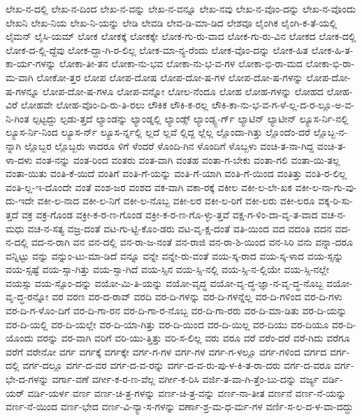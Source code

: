 {ಲೇಖ-ನ-ದಲ್ಲಿ
ಲೇಖ-ನ-ದಿಂದ
ಲೇಖ-ನ-ವನ್ನು
ಲೇಖ-ನ-ವನ್ನೂ
ಲೇಖ-ನವು
ಲೇಖ-ನ-ವೊಂ-ದನ್ನು
ಲೇಖ-ನ-ವೊಂದು
ಲೇಖನಿ
ಲೇಖ-ನಿಯ
ಲೇಖ-ನಿ-ಯನ್ನು
ಲೇಡಿ
ಲೇವಡಿ
ಲೇವ-ಡಿ-ಮಾ-ಡಿದ
ಲೇಶವೂ
ಲೈಂಗಿಕ
ಲೈಂಗಿ-ಕ-ತೆ-ಯಲ್ಲಿ
ಲೈಮನ್
ಲೈಸಿ-ಯಮ್
ಲೋಕ
ಲೋಕಕ್ಕೆ
ಲೋಕಕ್ಕೇ
ಲೋಕ-ಗು-ರು-ವಾದ
ಲೋಕ-ಗು-ರು-ವಿನ
ಲೋಕದ
ಲೋಕ-ದಲ್ಲಿ
ಲೋಕ-ದ-ಲ್ಲಿ-ದ್ದೆವು
ಲೋಕ-ದ್ದಾ-ಗಿ-ರ-ಲಿಲ್ಲ
ಲೋಕ-ಮಾ-ನ್ಯ-ರೆಂದು
ಲೋಕ-ವೊಂ-ದನ್ನು
ಲೋಕ-ಹಿತ
ಲೋಕ-ಹಿ-ತ-ಕಾ-ರ್ಯ-ಗಳನ್ನು
ಲೋಕಾ-ತೀ-ತನ
ಲೋಕಾ-ನು-ಭವ
ಲೋಕಾ-ನು-ಭ-ವ-ಗಳ
ಲೋಕಾ-ಭಿ-ರಾ-ಮದ
ಲೋಕಾ-ಭಿ-ರಾ-ಮ-ವಾಗಿ
ಲೋಕೋ-ತ್ತರ
ಲೋಪ
ಲೋಪ-ದೋಷ
ಲೋಪ-ದೋ-ಷ-ಗಳ
ಲೋಪ-ದೋ-ಷ-ಗಳನ್ನು
ಲೋಪ-ದೋ-ಷ-ಗಳನ್ನೂ
ಲೋಪ-ದೋ-ಷ-ಗಳೂ
ಲೋಪ-ವನ್ನೋ
ಲೋಲ-ನೆಂದೂ
ಲೋಹ
ಲೋಹ-ಗಳನ್ನು
ಲೋಹದ
ಲೋಹ-ವಿರೆ
ಲೋಹವೇ
ಲೋಹ-ವೊಂ-ದಿ-ರು-ತಿ-ರಲು
ಲೌಕಿಕ
ಲೌಕಿ-ಕ-ರಲ್ಲ
ಲೌಕಿ-ಕಾ-ನು-ಭ-ವ-ಗ-ಳೆ-ಲ್ಲ-ದ-ರ-ಲ್ಲೂ-ಅ-ವ-ನಿ-ಗಿಂತ
ಲ್ಪಟ್ಟದ್ದು
ಲ್ಪಡು-ತ್ತದೆ
ಲ್ಯಾಂಡನ್ನು
ಲ್ಯಾಂಡ್ನಲ್ಲಿ
ಲ್ಯಾಂಡ್ಸ್
ಲ್ಯಾಂಡ್ಸ್ಬ-ರ್ಗ್
ಲ್ಯಾಟಿನ್
ಲ್ಯಾಟೀನ್
ಲ್ಯೂಸ-ರ್ನಿ-ನಲ್ಲಿ
ಲ್ಯೂಸ-ರ್ನಿ-ನಿಂದ
ಲ್ಯೂಸ-ರ್ನ್
ಲ್ಯೂಸ-ರ್ನ್ನಲ್ಲಿ
ಲ್ಲದೆ
ಲ್ಲವೆ
ಲ್ಲಿದ್ದ
ಲ್ಲೆಲ್ಲ
ಲ್ಲೊಂದಾ-ಗಿತ್ತು
ಲ್ಲೊಂದೆಂ-ದರೆ
ಲ್ಲೊಬ್ಬ-ನ-ನ್ನಾಗಿ
ಲ್ಲೊಬ್ಬರ
ಲ್ಲೊಬ್ಬರು
ಳಾದರೂ
ಳಿಗೆ
ಳೆಂದರೆ
ಳೊಂದಿ-ಗಿನ
ಳೊಂದಿಗೆ
ಳೊಬ್ಬಳು
ವಂಚಿ-ತ-ನಾ-ಗಿದ್ದ
ವಂಚಿ-ತ-ಳಾ-ದಳು
ವಂತ-ನನ್ನು
ವಂತ-ರಿಂದ
ವಂತರು
ವಂತ-ವಾಗಿ
ವಂತಹ
ವಂತಾ-ಗ-ಬೇಕು
ವಂತಾ-ಗಲಿ
ವಂತಾ-ಯಿ-ತಲ್ಲ
ವಂತಾ-ಯಿತು
ವಂತಿ-ಕೆ-ಯಿದೆ
ವಂತಿಗೆ
ವಂತಿ-ಗೆ-ಯನ್ನು
ವಂತಿ-ಗೆ-ಯಾಗಿ
ವಂತಿ-ಗೆ-ಯಿಂದ
ವಂತಿತ್ತು
ವಂತಿ-ರ-ಲಿಲ್ಲ
ವಂತಿ-ಲ್ಲ-ಇ-ದೊಂದೇ
ವಂತೆ
ವಂಶ-ಜರ
ವಂಶದ
ವಕ-ವಾಗಿ
ವಕಾ-ರಕ್ಕೆ
ವಕೀಲ
ವಕೀ-ಲ-ಲೇ-ಖಕ
ವಕೀ-ಲ-ನಾ-ಗು-ವು-ದು-ಇದೇ
ವಕೀ-ಲ-ನಾದ
ವಕೀ-ಲ-ನಿಗೆ
ವಕೀ-ಲ-ನೊಬ್ಬ
ವಕೀ-ಲರ
ವಕೀ-ಲ-ರಿಗೆ
ವಕೀ-ಲರು
ವಕೀ-ಲರೂ
ವಕ್ಕ-ರಿ-ಸು-ತ್ತದೆ
ವಕ್ರ
ವಕ್ರ-ಗೊಂಡ
ವಕ್ರೀ-ಕ-ರ-ಣ-ಗೊಂಡ
ವಕ್ರೀ-ಕ-ರ-ಣ-ಗೊ-ಳ್ಳು-ತ್ತವೆ
ವಕ್ಷ-ಗ-ಳಿಂ-ದಾ-ವೃ-ತ-ವಾದ
ವಚ-ನ-ಮಧು
ವಚ-ನ-ಸತ್ಯ
ವಜ್ರ-ದಂತೆ
ವಟ-ಗು-ಟ್ಟಿ-ಕೊಂ-ಡರು
ವಟ-ವೃ-ಕ್ಷ-ದಂತೆ
ವತಿ-ಯಿಂದ
ವದ
ವದಂತಿ
ವದನ
ವದ-ನ-ದಲ್ಲಿ
ವದ-ನ-ರಾಗಿ
ವನ
ವನ-ದಲ್ಲಿ
ವನ-ರಾ-ಜ-ನಂತೆ
ವನ-ರಾಜಿ
ವನ-ರಾ-ಶಿ-ಯಿಂದ
ವನ-ಸಿರಿ
ವನು
ವನ್ನಾ-ದರೂ
ವನ್ನಿಟ್ಟು
ವನ್ನು
ವನ್ನುಂ-ಟು-ಮಾ-ಡಿದೆ
ವನ್ನೂ
ವನ್ನೇ
ವನ್ನೇ-ರು-ವಂತೆ
ವಯ-ಸ್ಕ-ರಾದ
ವಯ-ಸ್ಕ-ಳಾದ
ವಯ-ಸ್ಸನ್ನು
ವಯ-ಸ್ಸಷ್ಟೆ
ವಯ-ಸ್ಸಾ-ಗಿತ್ತು
ವಯ-ಸ್ಸಾ-ಗಿದೆ
ವಯ-ಸ್ಸಿನ
ವಯ-ಸ್ಸಿ-ನಲ್ಲಿ
ವಯ-ಸ್ಸಿ-ನ-ಲ್ಲಿಯೇ
ವಯ-ಸ್ಸಿ-ನಲ್ಲೇ
ವಯಸ್ಸು
ವಯ-ಸ್ಸೊಂ-ದನ್ನು
ವಯೋ-ಮಿ-ತಿ-ಯನ್ನು
ವಯೋ-ವೃದ್ಧ
ವಯೋ-ವೃ-ದ್ಧ-ಜ್ಞಾ-ನ-ವೃ-ದ್ಧ-ನೊಬ್ಬ
ವಯೋ-ವೃ-ದ್ಧ-ರನ್ನೋ
ವರ
ವರಣ
ವರ-ದ-ರಾವ್
ವರದಿ
ವರ-ದಿ-ಗಳನ್ನು
ವರ-ದಿ-ಗಳನ್ನೆಲ್ಲ
ವರ-ದಿ-ಗಳಿಂದ
ವರ-ದಿ-ಗಳು
ವರ-ದಿ-ಗ-ಳೊಂ-ದಿಗೆ
ವರ-ದಿ-ಗಾ-ರನ
ವರ-ದಿ-ಗಾ-ರ-ನೊಬ್ಬ
ವರ-ದಿ-ಗಾ-ರರು
ವರ-ದಿ-ಮಾ-ಡಿತು
ವರ-ದಿ-ಯನ್ನು
ವರ-ದಿ-ಯಲ್ಲಿ
ವರ-ದಿ-ಯಲ್ಲೇ
ವರ-ದಿ-ಯಾ-ಗಿತ್ತು
ವರ-ದಿ-ಯಿಂದ
ವರ-ದಿ-ಯಿಲ್ಲ
ವರ-ದಿಯು
ವರ-ದಿಯೂ
ವರ-ದಿ-ಯೊಂದು
ವರನ್ನು
ವರ-ವಾಗಿ
ವರಿಗೆ
ವರಿ-ಯು-ತ್ತಿತ್ತು
ವರಿ-ಸ-ಲಿಲ್ಲ
ವರು
ವರೂ
ವರೆ
ವರೆಂ-ದರೆ
ವರೆ-ಗಿದು
ವರೆಗೂ
ವರೆಗೆ
ವರೇನೋ
ವರ್ಗ
ವರ್ಗಕ್ಕೆ
ವರ್ಗಕ್ಕೇ
ವರ್ಗ-ಗ-ಗಳ
ವರ್ಗ-ಗಳ
ವರ್ಗ-ಗ-ಳಲ್ಲೂ
ವರ್ಗ-ಗಳಿಂದ
ವರ್ಗದ
ವರ್ಗ-ದಲ್ಲಿ
ವರ್ಗ-ದಲ್ಲೂ
ವರ್ಗ-ದ-ವರ
ವರ್ಗ-ದ-ವ-ರನ್ನು
ವರ್ಗ-ದ-ವ-ರು-ಪು-ಳ-ಕಿ-ತ-ರಾ-ದರು
ವರ್ಗ-ದ-ವರೂ
ವರ್ಗ-ಭೇ-ದ-ಗಳನ್ನು
ವರ್ಗಾ-ವಣೆ
ವರ್ಗೀ-ಕ-ರ-ಣ-ವೆಲ್ಲ
ವರ್ಗೀ-ಕ-ರಿಸಿ
ವರ್ಜಿ-ತ-ವಾ-ಗಿ-ತ್ತೆಂ-ಬು-ದನ್ನು
ವರ್ಜ್ಯ
ವರ್ಡಿ-ಯರ್
ವರ್ಡಿ-ಯರ್ಳ
ವರ್ಣ
ವರ್ಣ-ಚಿ-ತ್ರ-ಗಳನ್ನು
ವರ್ಣ-ಚಿ-ತ್ರ-ವನ್ನು
ವರ್ಣ-ನಾ-ತೀತ
ವರ್ಣನೆ
ವರ್ಣ-ನೆ-ಯನ್ನು
ವರ್ಣ-ನೆ-ಯಿಂದ
ವರ್ಣ-ಭೇದ
ವರ್ಣ-ವಿ-ನ್ಯಾ-ಸ-ಗಳನ್ನು
ವರ್ಣಾ-ಶ್ರ-ಮ-ಧ-ರ್ಮ-ಗಳ
ವರ್ಣಿ-ಸ-ಲ-ದ-ಳ-ವಾ-ದದ್ದು
}

